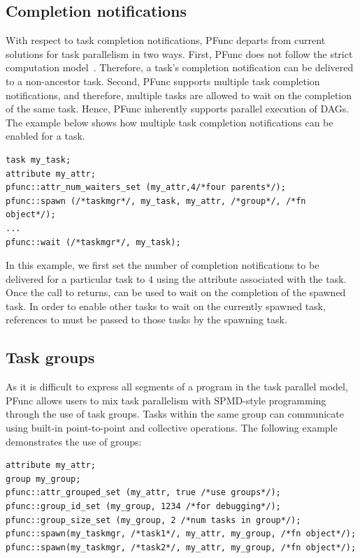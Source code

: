 \documentclass{sig-alternate}
\begin{document}
\subsection{Completion notifications}
\label{sec:completions}
With respect to task completion notifications, PFunc departs from current
solutions for task parallelism in two ways. First, PFunc does not follow the
strict computation model~\cite{Blumofe94}. Therefore, a task's completion
notification can be delivered to a non-ancestor task. Second, PFunc supports
multiple task completion notifications, and therefore, multiple tasks are
allowed to wait on the completion of the same task. Hence, PFunc inherently
supports parallel execution of DAGs.  The example below shows how multiple task
completion notifications can be enabled for a task. 

\begin{lstlisting}
task my_task;
attribute my_attr;
pfunc::attr_num_waiters_set (my_attr,4/*four parents*/);
pfunc::spawn (/*taskmgr*/, my_task, my_attr, /*group*/, /*fn object*/);
...
pfunc::wait (/*taskmgr*/, my_task);
\end{lstlisting}

In this example, we first set the number of completion notifications to be
delivered for a particular task to $4$ using the attribute associated
with the task. Once the call to  returns,  can be
used to wait on the completion of the spawned task. In order to enable other
tasks to wait on the currently spawned task, references to  must
be passed to those tasks by the spawning task.

\subsection{Task groups}
\label{sec:groups}
As it is difficult to express all segments of a program in the task parallel
model, PFunc allows users to mix task parallelism with SPMD-style programming
through the use of task groups.  Tasks within the same group can communicate
using built-in point-to-point and collective operations.  The following example
demonstrates the use of groups:

\begin{lstlisting}
attribute my_attr;
group my_group;
pfunc::attr_grouped_set (my_attr, true /*use groups*/);
pfunc::group_id_set (my_group, 1234 /*for debugging*/);
pfunc::group_size_set (my_group, 2 /*num tasks in group*/);
pfunc::spawn(my_taskmgr, /*task1*/, my_attr, my_group, /*fn object*/);
pfunc::spawn(my_taskmgr, /*task2*/, my_attr, my_group, /*fn object*/);
\end{lstlisting}
\end{document}
